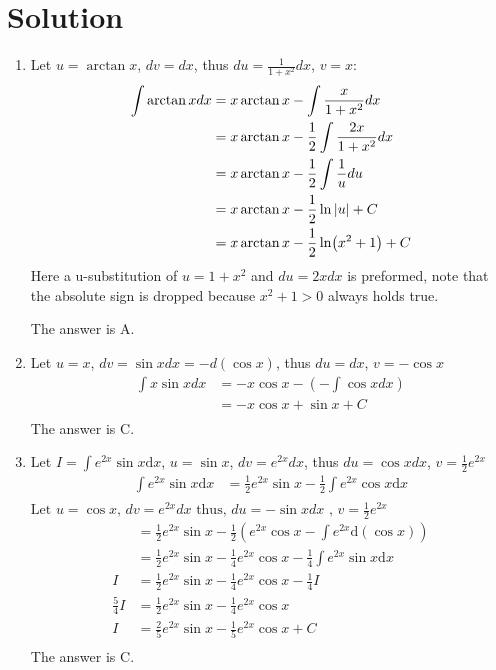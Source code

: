 \documentclass{article}
\numberwithin{equation}{section}
\begin{document}
\section{Solution}
\begin{enumerate}
    \item Let $u = \arctan x$, $dv = dx$, thus $du = \frac{1}{1+x^2} dx$, $v=x$:
    \begin{align*}
        \int \arctan x dx &= x\arctan x - \int \frac{x}{1+x^2}dx\\
        &= x\arctan x - \frac{1}{2}\int \frac{2x}{1+x^2} dx\\
        &= x\arctan x - \frac{1}{2} \int \frac{1}{u} du\\
        &= x\arctan x - \frac{1}{2} \ln \abs{u} +C\\
        &= x\arctan x - \frac{1}{2} \ln (x^2+1)+C\\
    \end{align*}
    Here a u-substitution of $u = 1+x^2$ and $du = 2x dx$ is preformed, note that the absolute sign is dropped because $x^2 + 1 > 0$ always holds true.

    The answer is A.

    \item Let $u = x$, $dv = \sin x dx = -d(\cos x)$, thus $du = dx$, $v = -\cos x$
    \begin{align*}
        \int x\sin x dx &= -x\cos x - \left(-\int \cos x dx\right)\\
        &= -x\cos x + \sin x +C\\
    \end{align*}
    The answer is C.

    \item Let $\displaystyle I = \int e^{2x} \sin x \mathrm{d}x$, $u = \sin x$, $dv = e^{2x} dx$, thus $du = \cos x dx$, $v = \frac{1}{2}e^{2x}$
    \begin{align*}
        \int e^{2x} \sin x \mathrm{d}x & = \frac{1}{2} e^{2x} \sin x - \frac{1}{2} \int e^{2x} \cos x \mathrm{d}x \\
    \end{align*}
    $\text{Let } u=\cos x \text{, } dv = e^{2x}dx \text{ thus, } du = -\sin x dx \text{ , } v = \frac{1}{2}e^{2x}$
    \begin{align*}
        & = \frac{1}{2} e^{2x} \sin x - \frac{1}{2}\left(e^{2x} \cos x -\int e^{2x} \mathrm{d}(\cos x)\right) \\
        & = \frac{1}{2} e^{2x} \sin x - \frac{1}{4} e^{2x} \cos x -\frac{1}{4}\int e^{2x} \sin x \mathrm{d}x \\
        I & = \frac{1}{2} e^{2x} \sin x - \frac{1}{4} e^{2x} \cos x -\frac{1}{4}I \\
        \frac{5}{4} I & = \frac{1}{2} e^{2x} \sin x - \frac{1}{4} e^{2x} \cos x \\
        I & =  \frac{2}{5} e^{2x} \sin x - \frac{1}{5} e^{2x} \cos x + C \\
    \end{align*}
    The answer is C.


\end{enumerate}
\end{document}
